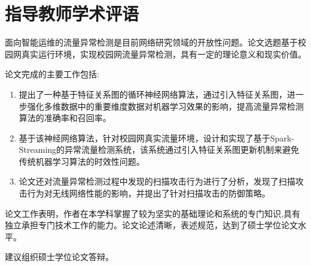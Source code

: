 
\chapter{指导教师学术评语}

面向智能运维的流量异常检测是目前网络研究领域的开放性问题。论文选题基于校园网真实运行环境，实现校园网流量异常检测，具有一定的理论意义和现实价值。

论文完成的主要工作包括:
\begin{enumerate}
    \item 提出了一种基于特征关系图的循环神经网络算法，通过引入特征关系图，进一步强化多维数据中的重要维度数据对机器学习效果的影响，提高流量异常检测算法的准确率和召回率。
    \item 基于该神经网络算法，针对校园网真实流量环境，设计和实现了基于Spark-Streaming的异常流量检测系统，该系统通过引入特征关系图更新机制来避免传统机器学习算法的时效性问题。
    \item 论文还对流量异常检测过程中发现的扫描攻击行为进行了分析，发现了扫描攻击行为对无线网络性能的影响，并提出了针对扫描攻击的防御策略。
\end{enumerate}
论文工作表明，作者在本学科掌握了较为坚实的基础理论和系统的专门知识,具有独立承担专门技术工作的能力。论文论述清晰，表述规范，达到了硕士学位论文水平。

建议组织硕士学位论文答辩。

